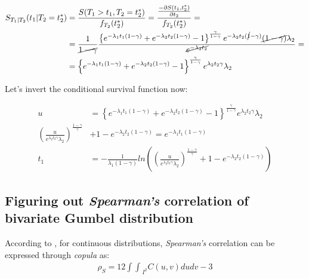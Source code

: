 \documentclass[]{article}
\begin{document}
  $$
  \begin{aligned}
  S_{T_1|T_2}(t_1|T_2=t_2^*) &= \frac{S(T_1 > t_1, T_2=t_2^*)}{f_{T_2}(t_2^*)}= \frac{\frac{-\partial S(t_1,t_2^*)}{\partial t_2}}{f_{T_2}(t_2^*)} =  \\
  &= \frac{1}{\cancel{1-\gamma}}   \frac{ \left\{  e^{-\lambda_1t_1(1-\gamma)} + e^{-\lambda_2t_2(1-\gamma)} - 1   \right\}^{\frac{\gamma}{1-\gamma}} e^{-\lambda_2 t_2(\cancel{1}-\gamma)} \cancel{(1-\gamma)}\lambda_2}{\cancel{e^{-\lambda_2 t_2}}} =\\
  &=    \left\{  e^{-\lambda_1t_1(1-\gamma)} + e^{-\lambda_2t_2(1-\gamma)} - 1   \right\}^{\frac{\gamma}{1-\gamma}} e^{\lambda_2 t_2\gamma} \lambda_2
  \end{aligned}
  $$

Let's invert the conditional survival function now:

	$$
	\begin{aligned}
		 u &= \left\{  e^{-\lambda_1t_1(1-\gamma)} + e^{-\lambda_2t_2(1-\gamma)} - 1   \right\}^{\frac{\gamma}{1-\gamma}} e^{\lambda_2 t_2\gamma} \lambda_2\\
		 \left(  \frac{u}{ e^{\lambda_2 t_2\gamma} \lambda_2}  \right)^{\frac{1-\gamma}{\gamma}} &+ 1 -e^{-\lambda_2t_2(1-\gamma)} =   e^{-\lambda_1t_1(1-\gamma)}\\
		  t_1 &=  -\frac{1}{\lambda_1(1-\gamma)} ln  \left(   \left(  \frac{u}{ e^{\lambda_2 t_2\gamma} \lambda_2}  \right)^{\frac{1-\gamma}{\gamma}}  + 1 -e^{-\lambda_2t_2(1-\gamma)}   \right)
	\end{aligned}
	$$



\subsection{Figuring out \emph{Spearman's} correlation of bivariate Gumbel distribution}
According to \cite{nelsen2007introduction}, for continuous distributions, \emph{Spearman's} correlation can be expressed through \emph{copula} as:
	$$
	\begin{aligned}
		 \rho_S = 12{\int\int}_{I^2}C(u, v)dudv - 3
	\end{aligned}
	$$
  
\end{document}
